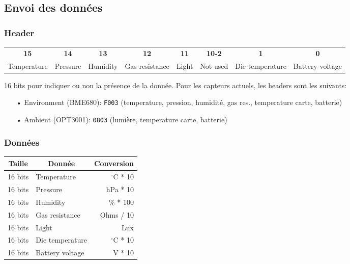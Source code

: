 \subsection{Envoi des données}
\subsubsection{Header}

\renewcommand{\arraystretch}{1.2}
\begin{tabular}{|c|c|c|c|c|c|c|c|}
\hline
\textbf{15} & \textbf{14} & \textbf{13} & \textbf{12} & \textbf{11} & \textbf{10-2} & \textbf{1} & \textbf{0} \\
\footnotesize{Temperature} & \footnotesize{Pressure} & \footnotesize{Humidity} & \footnotesize{Gas resistance} & \footnotesize{Light} & \footnotesize{Not used} & \footnotesize{Die temperature} & \footnotesize{Battery voltage} \\
\hline
\end{tabular}
\renewcommand{\arraystretch}{1}
\medskip

16 bits pour indiquer ou non la présence de la donnée. Pour les capteurs actuels, les headers sont les suivants:

\begin{itemize}
\item[•] Environment (BME680): \texttt{F003} (temperature, pression, humidité, gas res., temperature carte, batterie)
\item[•] Ambient (OPT3001): \texttt{0803} (lumière, temperature carte, batterie)
\end{itemize}
    
\subsubsection{Données}

\renewcommand{\arraystretch}{1.2}
\begin{tabular}{|l|l|r|}
\hline
\multicolumn{1}{|c|}{\textbf{Taille}} & \multicolumn{1}{|c|}{\textbf{Donnée}} & \multicolumn{1}{|c|}{\textbf{Conversion}} \\
\hline
16 bits & Temperature & $^\circ$C * 10 \\
16 bits & Pressure & hPa * 10 \\
16 bits & Humidity & \% * 100 \\
16 bits & Gas resistance & Ohms / 10 \\
16 bits & Light & Lux \\
16 bits & Die temperature & $^\circ$C * 10 \\
16 bits & Battery voltage & V * 10 \\
\hline
\end{tabular}
\renewcommand{\arraystretch}{1}
\vspace{5mm}

